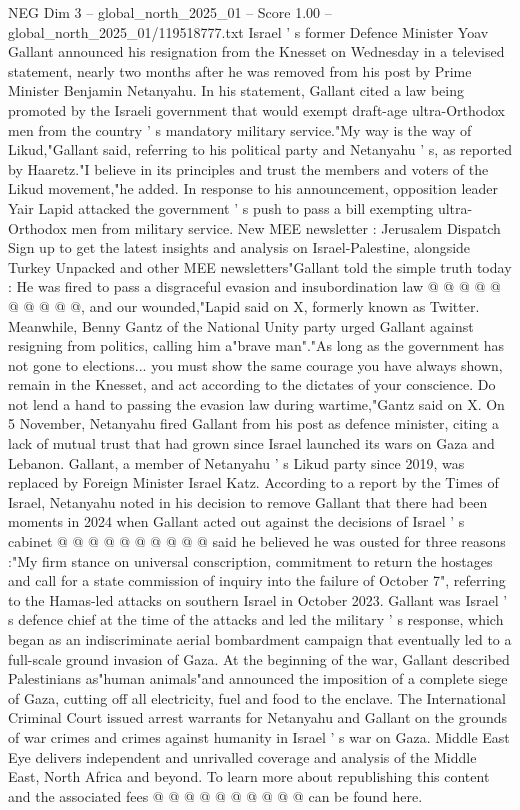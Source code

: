 \begin{textsample}{NEG Dim 3 – global\_north\_2025\_01 – Score 1.00 – global\_north\_2025\_01/119518777.txt}  \label{ex:f3_neg_216}
Israel ' s former Defence Minister Yoav Gallant announced his resignation from the Knesset on Wednesday in a televised statement, nearly two months after he was removed from his post by Prime Minister Benjamin Netanyahu.
In his statement, Gallant cited a law being promoted by the Israeli government that would exempt draft-age ultra-Orthodox men from the country ' s mandatory military service."My way is the way of Likud,"Gallant said, referring to his political party and Netanyahu ' s, as reported by Haaretz."I believe in its principles and trust the members and voters of the Likud movement,"he added.
In response to his announcement, opposition leader Yair Lapid attacked the government ' s push to pass a bill exempting ultra-Orthodox men from military service.
New MEE newsletter : Jerusalem Dispatch Sign up to get the latest insights and analysis on Israel-Palestine, alongside Turkey Unpacked and other MEE newsletters"Gallant told the simple truth today : He was fired to pass a disgraceful evasion and insubordination law @ @ @ @ @ @ @ @ @ @, and our wounded,"Lapid said on X, formerly known as Twitter.
Meanwhile, Benny Gantz of the National Unity party urged Gallant against resigning from politics, calling him a"brave man"."As long as the government has not gone to elections... you must show the same courage you have always shown, remain in the Knesset, and act according to the dictates of your conscience.
Do not lend a hand to passing the evasion law during wartime,"Gantz said on X.
On 5 November, Netanyahu fired Gallant from his post as defence minister, citing a lack of mutual trust that had grown since Israel launched its wars on Gaza and Lebanon.
Gallant, a member of Netanyahu ' s Likud party since 2019, was replaced by Foreign Minister Israel Katz.
According to a report by the Times of Israel, Netanyahu noted in his decision to remove Gallant that there had been moments in 2024 when Gallant acted out against the decisions of Israel ' s cabinet @ @ @ @ @ @ @ @ @ @ said he believed he was ousted for three reasons :"My firm stance on universal conscription, commitment to return the hostages and call for a state commission of inquiry into the failure of October 7", referring to the Hamas-led attacks on southern Israel in October 2023.
Gallant was Israel ' s defence chief at the time of the attacks and led the military ' s response, which began as an indiscriminate aerial bombardment campaign that eventually led to a full-scale ground invasion of Gaza.
At the beginning of the war, Gallant described Palestinians as"human animals"and announced the imposition of a complete siege of Gaza, cutting off all electricity, fuel and food to the enclave.
The International Criminal Court issued arrest warrants for Netanyahu and Gallant on the grounds of war crimes and crimes against humanity in Israel ' s war on Gaza.
Middle East Eye delivers independent and unrivalled coverage and analysis of the Middle East, North Africa and beyond.
To learn more about republishing this content and the associated fees @ @ @ @ @ @ @ @ @ @ can be found here.

\end{textsample}
